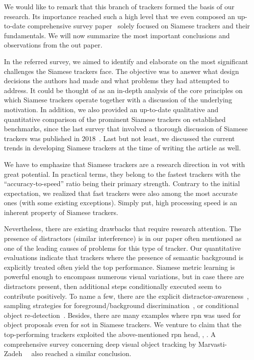 We would like to remark that this branch of trackers formed the basis of our research. Its importance reached such a high level that we even composed an up-to-date comprehensive survey paper~\cite{ondrasovic2021siamese} solely focused on Siamese trackers and their fundamentals. We will now summarize the most important conclusions and observations from the out paper.

In the referred survey, we aimed to identify and elaborate on the most significant challenges the Siamese trackers face. The objective was to answer what design decisions the authors had made and what problems they had attempted to address. It could be thought of as an in-depth analysis of the core principles on which Siamese trackers operate together with a discussion of the underlying motivation. In addition, we also provided an up-to-date qualitative and quantitative comparison of the prominent Siamese trackers on established benchmarks, since the last survey that involved a thorough discussion of Siamese trackers was published in $2018$~\cite{pflugfelder2018indepth}. Last but not least, we discussed the current trends in developing Siamese trackers at the time of writing the article as well.

We have to emphasize that Siamese trackers are a research direction in \gls{vot} with great potential. In practical terms, they belong to the fastest trackers with the ``accuracy-to-speed'' ratio being their primary strength. Contrary to the initial expectation, we realized that fast trackers were also among the most accurate ones (with some existing exceptions). Simply put, high processing speed is an inherent property of Siamese trackers.

Nevertheless, there are existing drawbacks that require research attention. The presence of distractors (similar interference) is in our paper often mentioned as one of the leading causes of problems for this type of tracker. Our quantitative evaluations indicate that trackers where the presence of semantic background is explicitly treated often yield the top performance. Siamese metric learning is powerful enough to encompass numerous visual variations, but in case there are distractors present, then additional steps conditionally executed seem to contribute positively. To name a few, there are the explicit distractor-awareness~\cite{zhu2018dasiamrpn}, sampling strategies for foreground/background discrimination~\cite{li2020figsiam}, or conditional object re-detection~\cite{li2019siamrm}. Besides, there are many examples where \gls{rpn} was used for object proposals even for \gls{sot} in Siamese trackers. We venture to claim that the top-performing trackers exploited the above-mentioned \gls{rpn} head, \egtext{}, \cite{li2018siamrpn, zhu2018dasiamrpn, li2018siamrpnpp}. A comprehensive survey concerning deep visual object tracking by Marvasti-Zadeh~\etal{}~\cite{marvastizadeh2021survey} also reached a similar conclusion.


